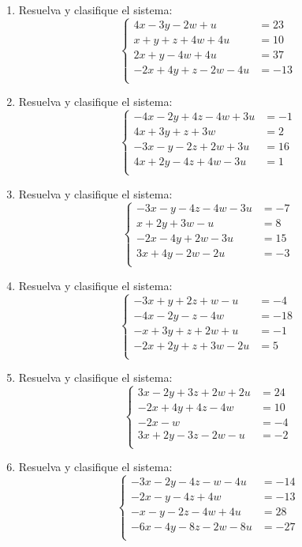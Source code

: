 \documentclass[11pt]{article}
\begin{document}
\begin{enumerate}
\[
\left\{\begin{aligned}
-2x+2y+2z-2w&=16\\
-2x-2y-2z+3u&=-7\\
-y+3z-3u&=10\\
-4x+4y+4z-4w&=33\\
\end{aligned}\right.
\]
\item Resuelva y clasifique el sistema:
\[
\left\{\begin{aligned}
4x-3y-2w+u&=23\\
x+y+z+4w+4u&=10\\
2x+y-4w+4u&=37\\
-2x+4y+z-2w-4u&=-13\\
\end{aligned}\right.
\]
\item Resuelva y clasifique el sistema:
\[
\left\{\begin{aligned}
-4x-2y+4z-4w+3u&=-1\\
4x+3y+z+3w&=2\\
-3x-y-2z+2w+3u&=16\\
4x+2y-4z+4w-3u&=1\\
\end{aligned}\right.
\]
\item Resuelva y clasifique el sistema:
\[
\left\{\begin{aligned}
-3x-y-4z-4w-3u&=-7\\
x+2y+3w-u&=8\\
-2x-4y+2w-3u&=15\\
3x+4y-2w-2u&=-3\\
\end{aligned}\right.
\]
\item Resuelva y clasifique el sistema:
\[
\left\{\begin{aligned}
-3x+y+2z+w-u&=-4\\
-4x-2y-z-4w&=-18\\
-x+3y+z+2w+u&=-1\\
-2x+2y+z+3w-2u&=5\\
\end{aligned}\right.
\]
\item Resuelva y clasifique el sistema:
\[
\left\{\begin{aligned}
3x-2y+3z+2w+2u&=24\\
-2x+4y+4z-4w&=10\\
-2x-w&=-4\\
3x+2y-3z-2w-u&=-2\\
\end{aligned}\right.
\]
\item Resuelva y clasifique el sistema:
\[
\left\{\begin{aligned}
-3x-2y-4z-w-4u&=-14\\
-2x-y-4z+4w&=-13\\
-x-y-2z-4w+4u&=28\\
-6x-4y-8z-2w-8u&=-27\\
\end{aligned}\right.
\]
\end{enumerate}
\end{document}
